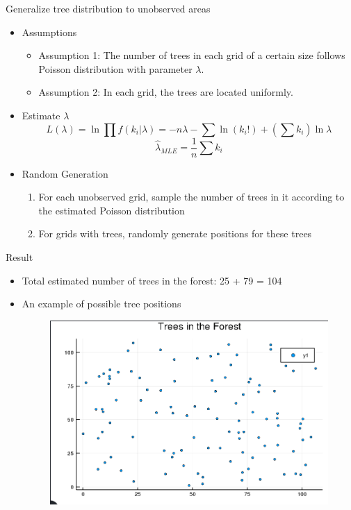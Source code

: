 \documentclass{beamer}
\begin{document}
\begin{frame}{Generalize tree distribution to unobserved areas}
    \begin{itemize}
    \item Assumptions
        \begin{itemize}
            \item Assumption 1: The number of trees in each grid of a certain size follows Poisson distribution with parameter $\lambda$.
            \item Assumption 2: In each grid, the trees are located uniformly.
        \end{itemize}
    \item Estimate $\lambda$
        $$L(\lambda)=\ln\prod f(k_i|\lambda)=-n\lambda-\sum\ln(k_i!)+(\sum k_i)\ln\lambda$$
        $$\hat{\lambda}_{MLE}=\frac{1}{n}\sum k_i$$
    \item Random Generation
        \begin{enumerate}
            \item For each unobserved grid, sample the number of trees in it according to the estimated Poisson distribution
            \item For grids with trees, randomly generate positions for these trees
        \end{enumerate}
    \end{itemize}
\end{frame}

\begin{frame}{Result}
    \begin{itemize}
    \item Total estimated number of trees in the forest: 25 + 79 = 104
    \item An example of possible tree positions
    \begin{figure}[H]
        \centering
        \includegraphics[scale=0.4]{final.png}
    \end{figure}
    \end{itemize}
\end{frame}
\end{document}
